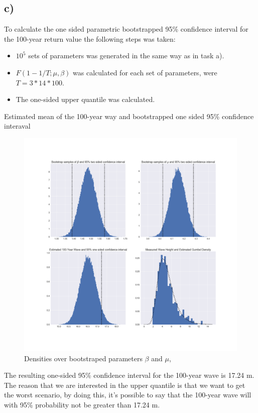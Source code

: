 \documentclass[a4paper]{article}
\begin{document}
\subsection*{c)}

To calculate the one sided parametric bootstrapped 95\% confidence interval for the 100-year return value the following steps was taken:

\begin{itemize}
    \item $10^5$ sets of parameters was generated in the same way as in task a).
    \item $F(1-1/T; \mu, \beta)$ was calculated for each set of parameters, were $T = 3*14*100$.
    \item The one-sided upper quantile was calculated.
\end{itemize}

\begin{table}[H]
    \centering
    \caption{Estimated mean of the 100-year way and bootstrapped one sided 95\% confidence interaval}
    \label{tab:bigwave}
    
\end{table}

\begin{figure}[H]
    \centering
    \includegraphics[width = 1.0\textwidth]{images/results_bootstrap.png}
    \caption{Densities over bootstraped parameters $\beta$ and $\mu$, }
    \label{}
\end{figure}

The resulting one-sided 95\% confidence interval for the 100-year wave is 17.24 m. The reason that we are interested in the upper quantile is that we want to get the worst scenario, by doing this, it's possible to say that the 100-year wave will with 95\% probability not be greater than 17.24 m. 
\end{document}
